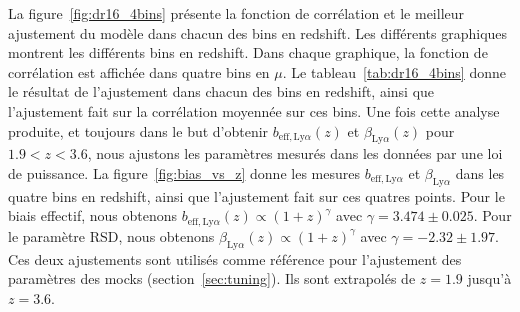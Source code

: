 La figure~\ref{fig:dr16_4bins} présente la fonction de corrélation et le meilleur ajustement du modèle dans chacun des bins en redshift. Les différents graphiques montrent les différents bins en redshift. Dans chaque graphique, la fonction de corrélation est affichée dans quatre bins en $\mu$. Le tableau~\ref{tab:dr16_4bins} donne le résultat de l'ajustement dans chacun des bins en redshift, ainsi que l'ajustement fait sur la corrélation moyennée sur ces bins.
Une fois cette analyse produite, et toujours dans le but d'obtenir $b_{\mathrm{eff},\mathrm{Ly}\alpha}(z)$ et $\beta_{\mathrm{Ly}\alpha}(z)$ pour $\num{1.9} < z  < \num{3.6}$, nous ajustons les paramètres \lya{} mesurés dans les données par une loi de puissance. La figure~\ref{fig:bias_vs_z} donne les mesures $b_{\mathrm{eff},\mathrm{Ly}\alpha}$ et $\beta_{\mathrm{Ly}\alpha}$ dans les quatre bins en redshift, ainsi que l'ajustement fait sur ces quatres points. Pour le biais effectif, nous obtenons $b_{\mathrm{eff},\mathrm{Ly}\alpha}(z) \propto (1+z)^{\gamma}$ avec $\gamma = \num{3.474} \pm \num{0.025}$. Pour le paramètre RSD, nous obtenons $\beta_{\mathrm{Ly}\alpha}(z) \propto (1+z)^{\gamma}$ avec $\gamma = - \num{2.32} \pm \num{1.97}$. Ces deux ajustements sont utilisés comme référence pour l'ajustement des paramètres des mocks (section~\ref{sec:tuning}). Ils sont extrapolés de $z = \num{1.9}$ jusqu'à $z = \num{3.6}$.


